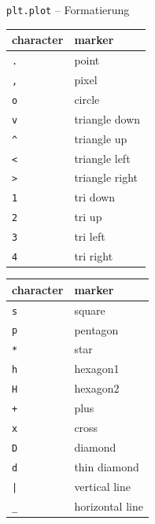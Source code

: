 \documentclass[utf8, smaller, c]{beamer}
\renewcommand{\tt}[1]{{\texttt{#1}}}
\begin{document}
\begin{frame}{\tt{plt.plot} -- Formatierung}
\begin{minipage}[t]{0.45\textwidth}
\begin{figure}
		\end{figure}
	\end{minipage}
	
	\pagebreak
	
	\vspace*{-2mm}
	\begin{minipage}[t]{0.45\textwidth}
		\begin{tabular}{|l|l|} \hline
		\textbf{character} & \textbf{marker} \\ \hline
		\verb|.| & point \\ \hline
		\verb|,| & pixel \\ \hline
		\verb|o| & circle \\ \hline
		\verb|v| & triangle down \\ \hline
		\verb|^| & triangle up \\ \hline
		\verb|<| & triangle left \\ \hline
		\verb|>| & triangle right \\ \hline
		\verb|1| & tri down \\ \hline
		\verb|2| & tri up \\ \hline
		\verb|3| & tri left \\ \hline
		\verb|4| & tri right \\ \hline
		\end{tabular}
	\end{minipage}
	\begin{minipage}[t]{0.45\textwidth}
		\begin{tabular}{|l|l|} \hline
		\textbf{character} & \textbf{marker} \\ \hline
		\verb+s+ & square \\ \hline
		\verb+p+ & pentagon \\ \hline
		\verb+*+ & star \\ \hline
		\verb+h+ & hexagon1 \\ \hline
		\verb+H+ & hexagon2 \\ \hline
		\verb|+| & plus \\ \hline
		\verb+x+ & cross \\ \hline
		\verb+D+ & diamond \\ \hline
		\verb+d+ & thin diamond \\ \hline
		\verb+|+ & vertical line \\ \hline
		\verb+_+ & horizontal line \\ \hline
		\end{tabular}
	\end{minipage}
	

\end{frame}
\end{document}
